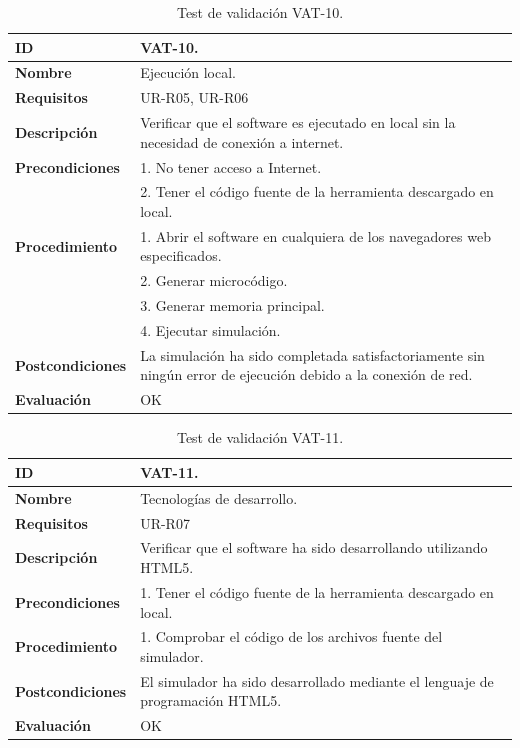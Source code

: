 \begin{center}
\begin{table}[htb]
\centering
\caption{Test de validación VAT-10.}
\begin{tabular}{@{}p{2.5cm} p{9cm}@{}} 
\toprule
\textbf{ID} 					& VAT-10. \\
\midrule
\textbf{Nombre} 				& Ejecución local. \\
\midrule
\textbf{Requisitos} 		& UR-R05, UR-R06\\
\midrule
\textbf{Descripción} 		& Verificar que el software es ejecutado en local sin la necesidad de conexión a internet. \\
\midrule
\textbf{Precondiciones}		& 1. No tener acceso a Internet.\\
											& 2. Tener el código fuente de la herramienta descargado en local.\\
\midrule
\textbf{Procedimiento}			& 1. Abrir el software en cualquiera de los navegadores web especificados. \\
							& 2. Generar microcódigo.\\
							& 3. Generar memoria principal.\\
							& 4. Ejecutar simulación.\\
\midrule
\textbf{Postcondiciones} 		&  La simulación ha sido completada satisfactoriamente sin ningún error de ejecución debido a la conexión de red.\\
\midrule
\textbf{Evaluación} 			& OK \\
\bottomrule
\end{tabular}
\label{tab:vat-10}
\end{table}
\end{center}

\begin{center}
\begin{table}[htb]
\centering
\caption{Test de validación VAT-11.}
\begin{tabular}{@{}p{2.5cm} p{9cm}@{}} 
\toprule
\textbf{ID} 					& VAT-11. \\
\midrule
\textbf{Nombre} 				& Tecnologías de desarrollo. \\
\midrule
\textbf{Requisitos} 		& UR-R07\\
\midrule
\textbf{Descripción} 		& Verificar que el software ha sido desarrollando utilizando HTML5. \\
\midrule
\textbf{Precondiciones}		& 1. Tener el código fuente de la herramienta descargado en local. \\
\midrule
\textbf{Procedimiento}		& 1. Comprobar el código de los archivos fuente del simulador.\\
\midrule
\textbf{Postcondiciones} 		&  El simulador ha sido desarrollado mediante el lenguaje de programación HTML5.\\
\midrule
\textbf{Evaluación} 			& OK \\
\bottomrule
\end{tabular}
\label{tab:vat-11}
\end{table}
\end{center}

